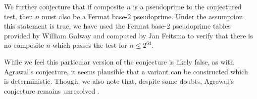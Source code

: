 \documentclass{article}
\theoremstyle{plain}
\theoremstyle{definition}
\begin{document}
We further conjecture that if composite $n$ is a pseudoprime to the conjectured test, then $n$ must also be a Fermat base-$2$ pseudoprime. Under the assumption this statement is true, we have used the Fermat base-$2$ pseudoprime tables provided by William Galway and computed by Jan Feitsma \cite{pseudoprimestables} to verify that there is no composite $n$ which passes the test for $n \leq 2^{64}$.

While we feel this particular version of the conjecture is likely false, as with Agrawal's conjecture, it seems plausible that a variant can be constructed which is deterministic. Though, we also note that, despite some doubts, Agrawal's conjecture remains unresolved \cite{lenstra2003agrawal, popovych2009agrawal}.

\begingroup
\raggedright


\endgroup
\end{document}
